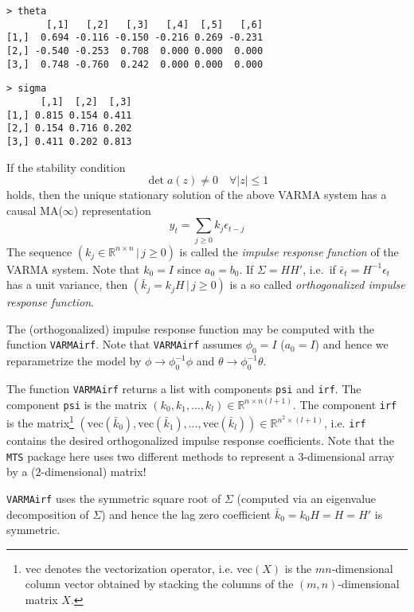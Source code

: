 \documentclass[]{article}
\let\rmarkdownfootnote\footnote%
\def\footnote{\protect\rmarkdownfootnote}
\begin{document}
\begin{verbatim}
> theta
       [,1]   [,2]   [,3]   [,4]  [,5]   [,6]
[1,]  0.694 -0.116 -0.150 -0.216 0.269 -0.231
[2,] -0.540 -0.253  0.708  0.000 0.000  0.000
[3,]  0.748 -0.760  0.242  0.000 0.000  0.000
\end{verbatim}

\begin{verbatim}
> sigma 
      [,1]  [,2]  [,3]
[1,] 0.815 0.154 0.411
[2,] 0.154 0.716 0.202
[3,] 0.411 0.202 0.813
\end{verbatim}

If the stability condition \[
\det a(z) \neq 0 \quad \forall |z|\leq 1
\] holds, then the unique stationary solution of the above VARMA system
has a causal MA(\(\infty\)) representation \[
y_t = \sum_{j\geq 0} k_j \epsilon_{t-j}
\] The sequence \((k_j\in\mathbb{R}^{n\times n}\,|\, j\geq 0)\) is
called the \emph{impulse response function} of the VARMA system. Note
that \(k_0=I\) since \(a_0=b_0\). If \(\Sigma=HH'\), i.e.~if
\(\bar{\epsilon}_t = H^{-1}\epsilon_t\) has a unit variance, then
\((\bar{k}_j=k_jH\,|\, j\geq 0)\) is a so called \emph{orthogonalized
impulse response function}.

The (orthogonalized) impulse response function may be computed with the
function \texttt{VARMAirf}. Note that \texttt{VARMAirf} assumes
\(\phi_0=I\) (\(a_0=I\)) and hence we reparametrize the model by
\(\phi \rightarrow \phi_0^{-1}\phi\) and
\(\theta \rightarrow \phi_0^{-1}\theta\).

The function \texttt{VARMAirf} returns a list with components
\texttt{psi} and \texttt{irf}. The component \texttt{psi} is the matrix
\((k_0,k_1,\ldots,k_l)\in\mathbb{R}^{n\times n(l+1)}\). The component
\texttt{irf} is the matrix\footnote{\(\mbox{vec}\) denotes the
  vectorization operator, i.e. \(\mbox{vec}(X)\) is the
  \(mn\)-dimensional column vector obtained by stacking the columns of
  the \((m,n)\)-dimensional matrix \(X\).}
\((\mbox{vec}(\bar{k}_0),\mbox{vec}(\bar{k}_1),\ldots,\mbox{vec}(\bar{k}_l))\in\mathbb{R}^{n^2\times (l+1)}\),
i.e. \texttt{irf} contains the desired orthogonalized impulse response
coefficients. Note that the \texttt{MTS} package here uses two different
methods to represent a \(3\)-dimensional array by a (\(2\)-dimensional)
matrix!

\texttt{VARMAirf} uses the symmetric square root of \(\Sigma\) (computed
via an eigenvalue decomposition of \(\Sigma\)) and hence the lag zero
coefficient \(\bar{k}_0=k_0 H=H=H'\) is symmetric.
\end{document}
